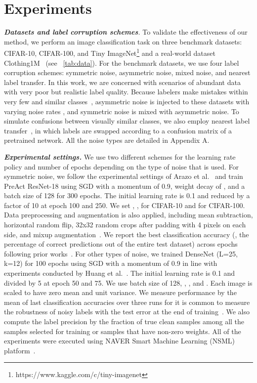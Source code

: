 \section{Experiments}

\noindent\emph{\textbf{Datasets and label corruption schemes}.}  To validate the effectiveness of our method, we perform an image classification task on three benchmark datasets: CIFAR-10\footnotemark, CIFAR-100\footnotemark[\value{footnote}],  and Tiny ImageNet\footnote{https://www.kaggle.com/c/tiny-imagenet} and a real-world dataset Clothing1M~\cite{xiao2015learning} (see \tablename~\ref{tab:data}). For the benchmark datasets, we use four label corruption schemes: symmetric noise, asymmetric noise, mixed noise, and nearest label transfer. In this work, we are concerned with scenarios of abundant data with very poor but realistic label quality. Because labelers make mistakes within very few and similar classes~\cite{han2018co,ren2018learning, yi2019probabilistic}, asymmetric noise is injected to these datasets with varying noise rates , and symmetric noise is mixed with asymmetric noise. To simulate confusions between visually similar classes, we also employ nearest label transfer~\cite{seo2019combinatorial}, in which labels are swapped according to a confusion matrix of a pretrained network. All the noise types are detailed in Appendix A.


\noindent\emph{\textbf{Experimental settings.}}
We use two different schemes for the learning rate policy and number of epochs depending on the type of noise that is used. For symmetric noise, we follow the experimental settings of Arazo et al.~\cite{arazo2019unsupervised} and train PreAct ResNet-18 using SGD with a momentum of 0.9, weight decay of , and a batch size of 128 for 300 epochs. The initial learning rate is 0.1 and reduced by a factor of 10 at epoch 100 and 250. We set , ,  for CIFAR-10 and  for CIFAR-100. Data preprocessing and augmentation is also applied, including mean subtraction, horizontal random flip, 32x32 random crops after padding with 4 pixels on each side, and mixup augmentation~\cite{zhang2018mixup}. We report the best classification accuracy (\ie, the percentage of correct predictions out of the entire test dataset) across epochs following prior works~\cite{seo2019combinatorial, arazo2019unsupervised}. For other types of noise, we trained DenseNet (L=25, k=12) for 100 epochs using SGD with a momentum of 0.9 in line with experiments conducted by Huang et al.~\cite{huang2017densely}. The initial learning rate is 0.1 and divided by 5 at epoch 50 and 75. We use batch size of 128, , , and . Each image is scaled to have zero mean and unit variance. We measure performance by the mean of last classification accuracies over three runs for it is common to measure the robustness of noisy labels with the test error at the end of training~\cite{malach2017decoupling, song2019selfie}. We also compute the label precision by the fraction of true clean samples among all the samples selected for training or samples that have non-zero weights. All of the experiments were executed using NAVER Smart Machine Learning (NSML) platform~\cite{kim2018nsml,sung2017nsml}. 



